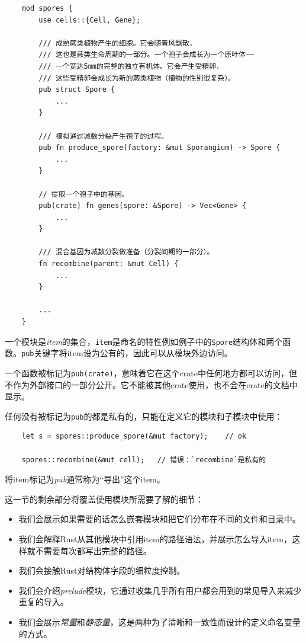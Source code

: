 \begin{verbatim}
    mod spores {
        use cells::{Cell, Gene};

        /// 成熟蕨类植物产生的细胞。它会随着风飘散，
        /// 这也是蕨类生命周期的一部分。一个孢子会成长为一个原叶体——
        /// 一个宽达5mm的完整的独立有机体。它会产生受精卵，
        /// 这些受精卵会成长为新的蕨类植物（植物的性别很复杂）。
        pub struct Spore {
            ...
        }

        /// 模拟通过减数分裂产生孢子的过程。
        pub fn produce_spore(factory: &mut Sporangium) -> Spore {
            ...
        }

        // 提取一个孢子中的基因。
        pub(crate) fn genes(spore: &Spore) -> Vec<Gene> {
            ...
        }

        /// 混合基因为减数分裂做准备（分裂间期的一部分）。
        fn recombine(parent: &mut Cell) {
            ...
        }

        ...
    }
\end{verbatim}

一个模块是\emph{item}的集合，\texttt{item}是命名的特性例如例子中的\texttt{Spore}结构体和两个函数。\texttt{pub}关键字将item设为公有的，因此可以从模块外边访问。

一个函数被标记为\texttt{pub(crate)}，意味着它在这个crate中任何地方都可以访问，但不作为外部接口的一部分公开。它不能被其他crate使用，也不会在crate的文档中显示。

任何没有被标记为\texttt{pub}的都是私有的，只能在定义它的模块和子模块中使用：
\begin{verbatim}
    let s = spores::produce_spore(&mut factory);    // ok
    
    spores::recombine(&mut cell);   // 错误：`recombine`是私有的
\end{verbatim}

将item标记为\emph{pub}通常称为“导出”这个item。

这一节的剩余部分将覆盖使用模块所需要了解的细节：
\begin{itemize}
    \item 我们会展示如果需要的话怎么嵌套模块和把它们分布在不同的文件和目录中。
    \item 我们会解释Rust从其他模块中引用item的路径语法，并展示怎么导入item，这样就不需要每次都写出完整的路径。
    \item 我们会接触Rust对结构体字段的细粒度控制。
    \item 我们会介绍\emph{prelude}模块，它通过收集几乎所有用户都会用到的常见导入来减少重复的导入。
    \item 我们会展示\emph{常量}和\emph{静态量}，这是两种为了清晰和一致性而设计的定义命名变量的方式。
\end{itemize}

